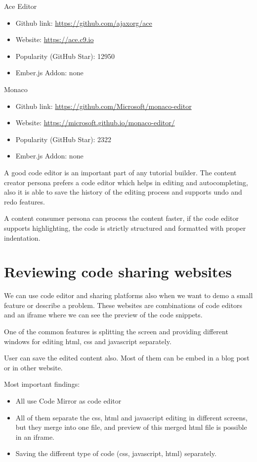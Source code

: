 \documentclass[11pt, a4paper, oneside, openright, medskipamount]{report}
\begin{document}
\noindent Ace Editor
\begin{itemize}[noitemsep]
\item Github link: \url{https://github.com/ajaxorg/ace}
\item Website: \url{https://ace.c9.io}
\item Popularity (GitHub Star): 12950
\item Ember.js Addon: none
\end{itemize}

\noindent Monaco
\begin{itemize}[noitemsep]
\item Github link: \url{https://github.com/Microsoft/monaco-editor}
\item Website: \url{https://microsoft.github.io/monaco-editor/}
\item Popularity (GitHub Star): 2322
\item Ember.js Addon: none
\end{itemize}

A good code editor is an important part of any tutorial builder. The content creator persona prefers a code editor which helps in editing and autocompleting, also it is able to save the history of the editing process and supports undo and redo features.

A content consumer persona can process the content faster, if the code editor supports highlighting, the code is strictly structured and formatted with proper indentation.

\section{Reviewing code sharing websites}

We can use code editor and sharing platforms also when we want to demo a small feature or describe a problem. These websites are combinations of code editors and an iframe where we can see the preview of the code snippets.

One of the common features is splitting the screen and providing different windows for editing html, css and javascript separately.

User can save the edited content also. Most of them can be embed in a blog post or in other website.

\noindent Most important findings:
\begin{itemize}[noitemsep]
\item All use Code Mirror as code editor
\item All of them separate the css, html and javascript editing in different screens, but they merge into one file, and preview of this merged html file is possible in an iframe.
\item Saving the different type of code (css, javascript, html) separately.
\end{itemize}
\end{document}
